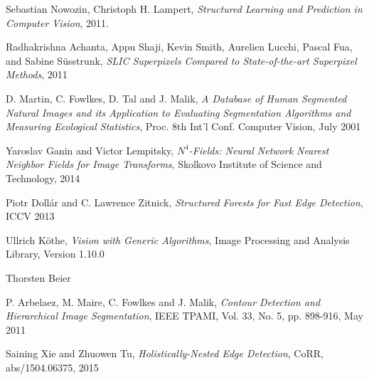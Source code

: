 
\manualmark
\markboth{\spacedlowsmallcaps{\bibname}}{\spacedlowsmallcaps{\bibname}} %
{}
\label{app:bibliography}




\begin{thebibliography}{9}

  Sebastian Nowozin, Christoph H. Lampert,
  \emph{Structured Learning and Prediction in Computer Vision},
  2011.
  
  Radhakrishna Achanta, Appu Shaji, Kevin Smith, Aurelien Lucchi, Pascal Fua, and Sabine Süsstrunk, 
  \emph{SLIC Superpixels Compared to State-of-the-art Superpixel Methods},
  2011
  
	D. Martin, C. Fowlkes, D. Tal and J. Malik,
	\emph{A Database of Human Segmented Natural Images and its
	           Application to Evaluating Segmentation Algorithms and
	           Measuring Ecological Statistics},
	Proc. 8th Int'l Conf. Computer Vision,
	July 2001		
	
	Yaroslav Ganin and Victor Lempitsky,
	\emph{$N^4$-Fields: Neural Network Nearest Neighbor Fields for Image Transforms},
	Skolkovo Institute of Science and Technology,
	2014
	
  Piotr Dollár and C. Lawrence Zitnick,
  \emph{Structured Forests for Fast Edge Detection},
  ICCV 2013
  
 	Ullrich Köthe,
 	\emph{Vision with Generic Algorithms},
 	Image Processing and Analysis Library,
 	Version 1.10.0
 	
 	Thorsten Beier
 	
 	P. Arbelaez, M. Maire, C. Fowlkes and J. Malik, 
 	\emph{Contour Detection and Hierarchical Image Segmentation},
 	IEEE TPAMI, Vol. 33, No. 5, pp. 898-916, May 2011
 	
 	Saining Xie and Zhuowen Tu,
 	\emph{Holistically-Nested Edge Detection},
 	CoRR, abs/1504.06375, 2015
 

\end{thebibliography}

